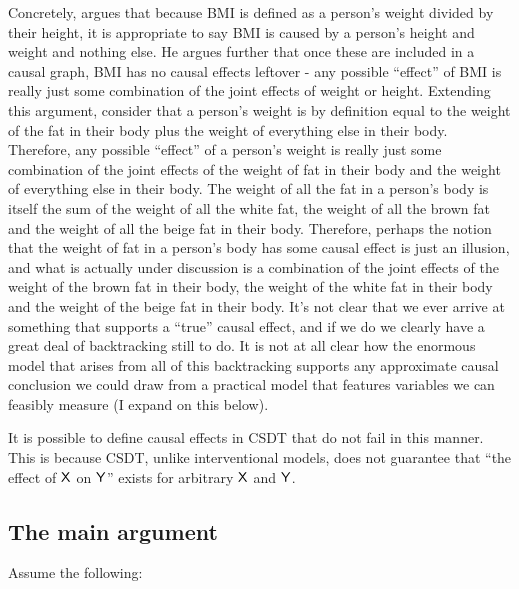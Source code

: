Concretely, \citet{shahar_association_2009} argues that because BMI is defined as a person's weight divided by their height, it is appropriate to say BMI is caused by a person's height and weight and nothing else. He argues further that once these are included in a causal graph, BMI has no causal effects leftover - any possible ``effect'' of BMI is really just some combination of the joint effects of weight or height. Extending this argument, consider that a person's weight is by definition equal to the weight of the fat in their body plus the weight of everything else in their body. Therefore, any possible ``effect'' of a person's weight is really just some combination of the joint effects of the weight of fat in their body and the weight of everything else in their body. The weight of all the fat in a person's body is itself the sum of the weight of all the white fat, the weight of all the brown fat and the weight of all the beige fat in their body. Therefore, perhaps the notion that the weight of fat in a person's body has some causal effect is just an illusion, and what is actually under discussion is a combination of the joint effects of the weight of the brown fat in their body, the weight of the white fat in their body and the weight of the beige fat in their body. It's not clear that we ever arrive at something that supports a ``true'' causal effect, and if we do we clearly have a great deal of backtracking still to do. It is not at all clear how the enormous model that arises from all of this backtracking supports any approximate causal conclusion we could draw from a practical model that features variables we can feasibly measure (I expand on this below).

It is possible to define causal effects in CSDT that do not fail in this manner. This is because CSDT, unlike interventional models, does not guarantee that ``the effect of $\mathsf{X}$ on $\mathsf{Y}$'' exists for arbitrary $\mathsf{X}$ and $\mathsf{Y}$.

\subsection{The main argument}

Assume the following:

